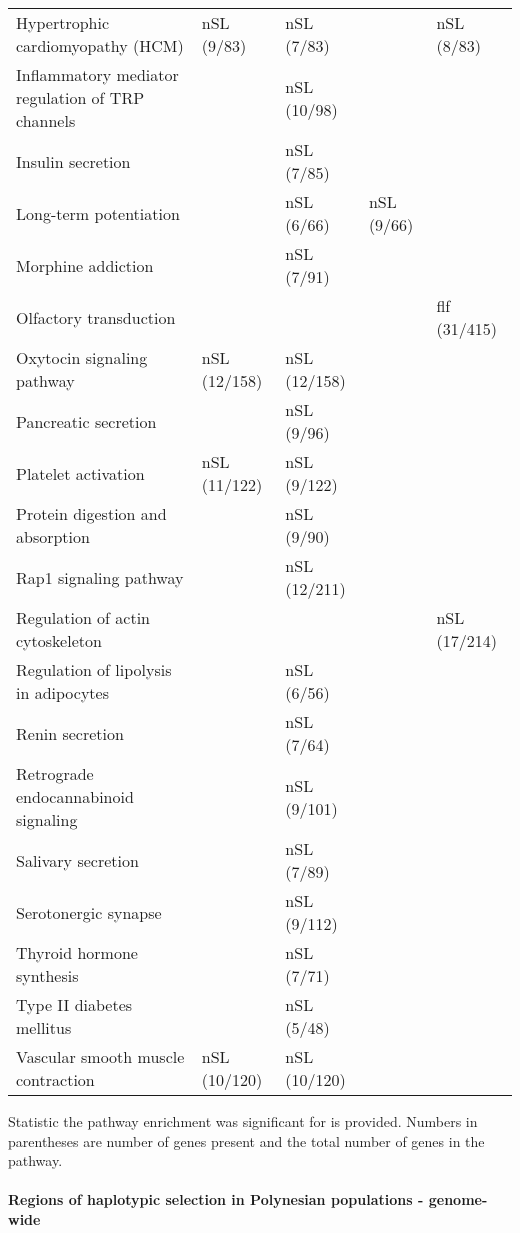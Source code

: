 \documentclass[]{report}
\let\oldparagraph\paragraph
\renewcommand{\paragraph}[1]{\oldparagraph{#1}\mbox{}}
\begin{document}
\begin{table}
{\begin{threeparttable}
\begin{tabular}[t]{lllll}
Hypertrophic cardiomyopathy (HCM) & nSL (9/83) & nSL (7/83) &  & nSL (8/83)\\
Inflammatory mediator regulation of TRP channels &  & nSL (10/98) &  & \\
Insulin secretion &  & nSL (7/85) &  & \\
Long-term potentiation &  & nSL (6/66) & nSL (9/66) & \\
Morphine addiction &  & nSL (7/91) &  & \\
Olfactory transduction &  &  &  & \gls{flf} (31/415)\\
Oxytocin signaling pathway & nSL (12/158) & nSL (12/158) &  & \\
Pancreatic secretion &  & nSL (9/96) &  & \\
Platelet activation & nSL (11/122) & nSL (9/122) &  & \\
Protein digestion and absorption &  & nSL (9/90) &  & \\
Rap1 signaling pathway &  & nSL (12/211) &  & \\
Regulation of actin cytoskeleton &  &  &  & nSL (17/214)\\
Regulation of lipolysis in adipocytes &  & nSL (6/56) &  & \\
Renin secretion &  & nSL (7/64) &  & \\
Retrograde endocannabinoid signaling &  & nSL (9/101) &  & \\
Salivary secretion &  & nSL (7/89) &  & \\
Serotonergic synapse &  & nSL (9/112) &  & \\
Thyroid hormone synthesis &  & nSL (7/71) &  & \\
Type II diabetes mellitus &  & nSL (5/48) &  & \\
Vascular smooth muscle contraction & nSL (10/120) & nSL (10/120) &  & \\
\bottomrule
\end{tabular}
\begin{tablenotes}
\item Statistic the pathway enrichment was significant for is provided. Numbers in parentheses are number of genes present and the total number of genes in the pathway.
\end{tablenotes}
\end{threeparttable}}
\end{table}

\paragraph{Regions of haplotypic selection in Polynesian populations -
genome-wide}\label{regions-of-haplotypic-selection-in-polynesian-populations---genome-wide}
\end{document}
